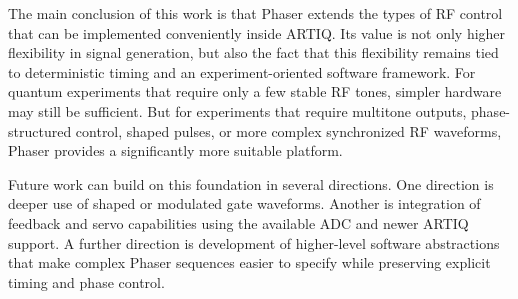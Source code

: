 The main conclusion of this work is that Phaser extends the types of RF control that can be implemented conveniently inside ARTIQ. Its value is not only higher flexibility in signal generation, but also the fact that this flexibility remains tied to deterministic timing and an experiment-oriented software framework. For quantum experiments that require only a few stable RF tones, simpler hardware may still be sufficient. But for experiments that require multitone outputs, phase-structured control, shaped pulses, or more complex synchronized RF waveforms, Phaser provides a significantly more suitable platform.

Future work can build on this foundation in several directions. One direction is deeper use of shaped or modulated gate waveforms. Another is integration of feedback and servo capabilities using the available ADC and newer ARTIQ support. A further direction is development of higher-level software abstractions that make complex Phaser sequences easier to specify while preserving explicit timing and phase control. 